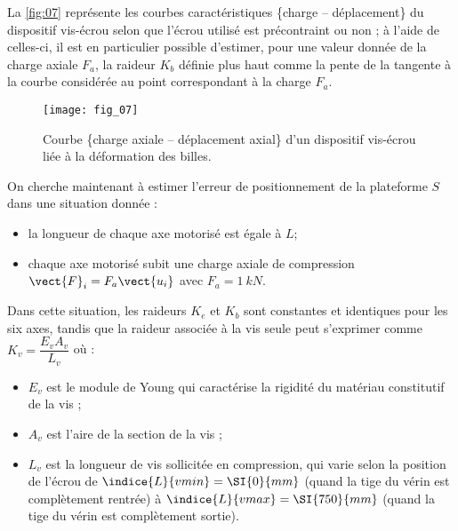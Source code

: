 \ifprof
\begin{corrige}
\end{corrige}
\else
\fi

La \autoref{fig:07} représente les courbes caractéristiques \{charge -- déplacement\} du dispositif vis-écrou selon que l’écrou utilisé est précontraint ou non ; à l’aide de celles-ci, il est en particulier possible d’estimer, pour une
valeur donnée de la charge axiale $F_a$, la raideur $K_b$ définie plus haut comme la pente de la tangente à la courbe considérée au point correspondant à la charge $F_a$.


\begin{figure}[H]
\centering
\texttt{[image: fig\_07]}
\caption{\label{fig:07}  Courbe \{charge axiale -- déplacement axial\} d’un dispositif vis-écrou liée à la
déformation des billes.}
\end{figure}


\ifprof
\begin{corrige}
\end{corrige}
\else
\fi


On cherche maintenant à estimer l’erreur de positionnement de la plateforme $S$ dans une situation donnée :
\begin{itemize}
\item la longueur de chaque axe motorisé est égale à $L$;
\item chaque axe motorisé subit une charge axiale de compression $\vect{F}_i=F_a \vect{u_i}$ avec $F_a = \SI{1}{kN}$.
\end{itemize}

Dans cette situation, les raideurs $K_e$ et $K_b$ sont constantes et identiques pour les six axes, tandis que la raideur associée à la vis seule peut s’exprimer comme $K_v = \dfrac{E_v A_v}{L_v}$ où :
\begin{itemize}
\item $E_v$ est le module de Young qui caractérise la rigidité du matériau constitutif de la vis ;
\item $A_v$ est l’aire de la section de la vis ;
\item $L_v$ est la longueur de vis sollicitée en compression, qui varie selon la position de l’écrou de $\indice{L}{v min}= \SI{0}{mm}$ (quand la tige du vérin est complètement rentrée) à $\indice{L}{v max}= \SI{750}{mm}$ (quand la tige du vérin est complètement
sortie).
\end{itemize}

